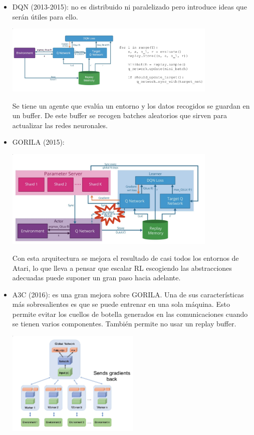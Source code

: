 \begin{itemize}
    \item DQN (2013-2015): no es distribuido ni paralelizado pero introduce ideas que serán
        útiles para ello.
    \begin{center}
        \includegraphics[width=0.8\textwidth]{figures/2020-07-13-142101_937x307_scrot.png}
    \end{center}
    Se tiene un agente que evalúa un entorno y los datos recogidos se guardan en un buffer. De
    este buffer se recogen batches aleatorios que sirven para actualizar las redes
    neuronales.
    \item GORILA (2015): 
    \begin{center}
    \includegraphics[width=0.8\textwidth]{figures/2020-07-13-142538_994x464_scrot.png}
    \end{center}
    Con esta arquitectura se mejora el resultado de casi todos los entornos de Atari, lo que
    lleva a pensar que escalar RL escogiendo las abstracciones adecuadas puede suponer un
    gran paso hacia adelante.
\item A3C (2016): es una gran mejora sobre GORILA. Una de sus características más
    sobresalientes es que se puede entrenar en una sola máquina. Esto permite evitar los
    cuellos de botella generados en las comunicaciones cuando se tienen varios componentes.
    También permite no usar un replay buffer.
\begin{center}
\includegraphics[width=0.5\textwidth]{figures/2020-07-13-143306_481x381_scrot.png}

\end{center}
\end{itemize}
